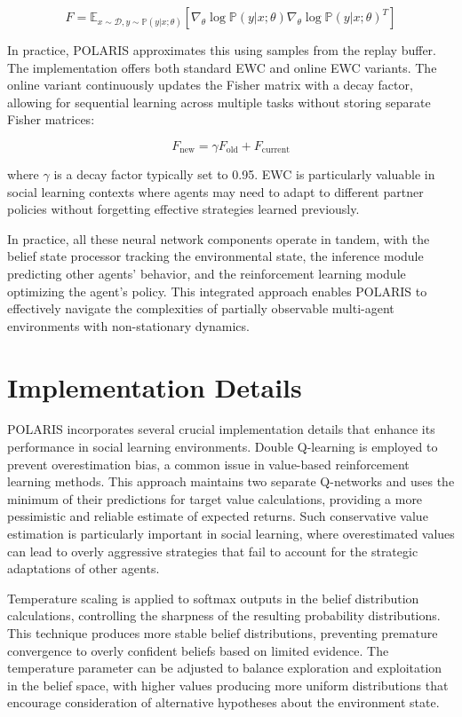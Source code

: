 \begin{equation}
    F = \mathbb{E}_{x \sim \mathcal{D}, y \sim \mathbb{P}(y|x; \theta)} \left[ \nabla_\theta \log \mathbb{P}(y|x; \theta) \nabla_\theta \log \mathbb{P}(y|x; \theta)^T \right]
\end{equation}

In practice, POLARIS approximates this using samples from the replay buffer. The implementation offers both standard EWC and online EWC variants. The online variant continuously updates the Fisher matrix with a decay factor, allowing for sequential learning across multiple tasks without storing separate Fisher matrices:

\begin{equation}
    F_{\text{new}} = \gamma F_{\text{old}} + F_{\text{current}}
\end{equation}

where $\gamma$ is a decay factor typically set to 0.95. EWC is particularly valuable in social learning contexts where agents may need to adapt to different partner policies without forgetting effective strategies learned previously.

In practice, all these neural network components operate in tandem, with the belief state processor tracking the environmental state, the inference module predicting other agents' behavior, and the reinforcement learning module optimizing the agent's policy. This integrated approach enables POLARIS to effectively navigate the complexities of partially observable multi-agent environments with non-stationary dynamics.

\section{Implementation Details}

POLARIS incorporates several crucial implementation details that enhance its performance in social learning environments. Double Q-learning is employed to prevent overestimation bias, a common issue in value-based reinforcement learning methods. This approach maintains two separate Q-networks and uses the minimum of their predictions for target value calculations, providing a more pessimistic and reliable estimate of expected returns. Such conservative value estimation is particularly important in social learning, where overestimated values can lead to overly aggressive strategies that fail to account for the strategic adaptations of other agents.

Temperature scaling is applied to softmax outputs in the belief distribution calculations, controlling the sharpness of the resulting probability distributions. This technique produces more stable belief distributions, preventing premature convergence to overly confident beliefs based on limited evidence. The temperature parameter can be adjusted to balance exploration and exploitation in the belief space, with higher values producing more uniform distributions that encourage consideration of alternative hypotheses about the environment state.

